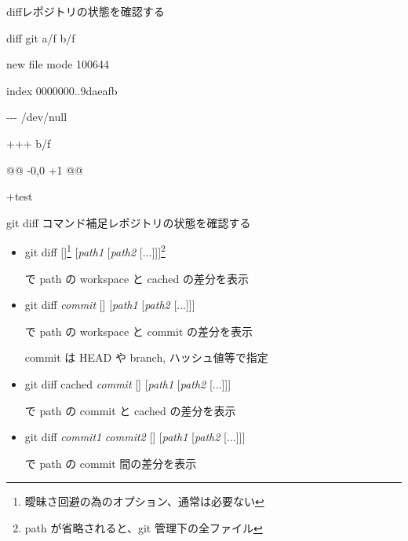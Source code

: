 \begin{frame}[t]{diff}{レポジトリの状態を確認する}
{{      diff {\dhyphen}git a/f b/f

      new file mode 100644

      index 0000000..9daeafb

      {\hyphen}{\hyphen}{\hyphen} /dev/null

      +++ b/f

      @@ -0,0 +1 @@

      +test
    }
  }


\end{frame}


\begin{frame}[t]{git diff コマンド補足}{レポジトリの状態を確認する}

  \begin{itemize}
  \item git diff [{\dhyphen}]\footnote{曖昧さ回避の為のオプション、通常は必要ない} [\textit{path1} [\textit{path2} [...]]]\footnote{path が省略されると、git 管理下の全ファイル}

    で path の workspace と cached の差分を表示
    \vspace{2ex}

  \item git diff \textit{commit} [{\dhyphen}] [\textit{path1} [\textit{path2} [...]]]

    で path の workspace と commit の差分を表示

    commit は HEAD や branch, ハッシュ値等で指定
    \vspace{2ex}

  \item git diff {\dhyphen}cached \textit{commit} [{\dhyphen}] [\textit{path1} [\textit{path2} [...]]]

    で path の commit と cached の差分を表示
    \vspace{2ex}

  \item git diff \textit{commit1} \textit{commit2} [{\dhyphen}] [\textit{path1} [\textit{path2} [...]]]

    で path の commit 間の差分を表示
  \end{itemize}

\end{frame}
